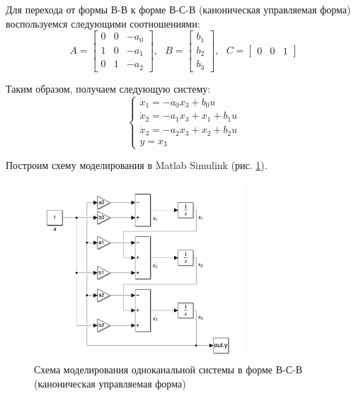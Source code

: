 Для перехода от формы В-В к форме В-С-В (каноническая управляемая форма) воспользуемся следующими соотношениями:
\begin{equation}
    A = \begin{bmatrix}
        0 & 0 & -a_0 \\
        1 & 0 & -a_1 \\
        0 & 1 & -a_2
    \end{bmatrix},~~~
    B = \begin{bmatrix}
        b_1 \\
        b_2 \\
        b_3
    \end{bmatrix},~~~
    C = \begin{bmatrix}
        0 & 0 & 1
    \end{bmatrix}
\end{equation}

Таким образом, получаем следующую систему:
\begin{equation}
    \begin{cases}
        \dot{x}_1 = -a_0 x_3 + b_0 u\\
        \dot{x}_2 = -a_1 x_3 + x_1 + b_1 u\\
        \dot{x}_3 = -a_2 x_3 + x_2 + b_2 u \\
        y = x_3
    \end{cases}
\end{equation}

Построим схему моделирования в Matlab Simulink (рис. \ref{fig:model3}).

\begin{figure}[ht!]
    \centering
    \includegraphics[width=0.7\textwidth]{media/system3.png}
    \caption{Схема моделирования одноканальной системы в форме В-С-В (каноническая управляемая форма)}
    \label{fig:model3}
\end{figure}


